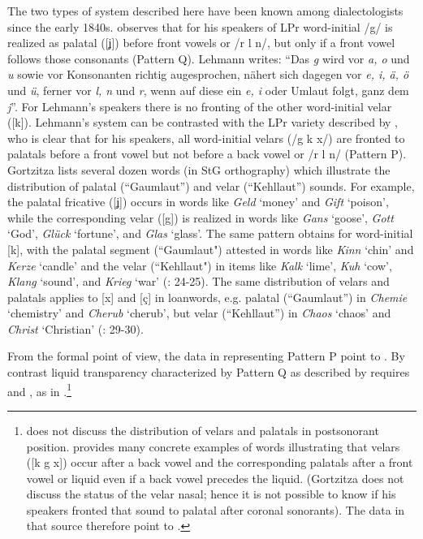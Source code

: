 The two types of system described here have been known among dialectologists since the early 1840s. \citet[30--32]{Lehmann1842} observes that for his speakers of LPr word-initial /g/ is realized as palatal ([ʝ]) before front vowels or /r l n/, but only if a front vowel follows those consonants (Pattern Q). Lehmann writes: “Das \textit{g} wird vor \textit{a, o} und \textit{u} sowie vor Konsonanten richtig augesprochen, nähert sich dagegen vor \textit{e, i, ä, ö} und \textit{ü}, ferner vor \textit{l, n} und \textit{r}, wenn auf diese ein \textit{e, i} oder Umlaut folgt, ganz dem \textit{j}”.  For Lehmann’s speakers there is no fronting of the other word-initial velar ([k]). Lehmann's system can be contrasted with the LPr variety described by \citet[29--30]{Gortzitza1841}, who is clear that for his speakers, all word-initial velars (/g k x/) are fronted to palatals before a front vowel but not before a back vowel or /r l n/ (Pattern P). Gortzitza lists several dozen words (in StG orthography) which illustrate the distribution of palatal (“Gaumlaut”) and velar (“Kehllaut”) sounds. For example, the palatal fricative ([ʝ]) occurs in words like \textit{Geld} ‘money’ and \textit{Gift} ‘poison’, while the corresponding velar ([g]) is realized in words like \textit{Gans} ‘goose’, \textit{Gott} ‘God’, \textit{Glück} ‘fortune’, and \textit{Glas} ‘glass’. The same pattern obtains for word-initial [k], with the palatal segment (“Gaumlaut") attested in words like \textit{Kinn} ‘chin’ and \textit{Kerze} ‘candle’ and the velar (“Kehllaut") in items like \textit{Kalk} ‘lime’, \textit{Kuh} ‘cow’, \textit{Klang} ‘sound’, and \textit{Krieg} ‘war’ (\citealt{Gortzitza1841}: 24-25). The same distribution of velars and palatals applies to [x] and [ç] in loanwords, e.g. palatal (“Gaumlaut”) in \textit{Chemie} ‘chemistry’ and \textit{Cherub} ‘cherub’, but velar (“Kehllaut”) in \textit{Chaos} ‘chaos’ and \textit{Christ} ‘Christian’ (\citealt{Gortzitza1841}: 29-30). 

From the formal point of view, the data in \citet{Gortzitza1841} representing Pattern P point to . By contrast liquid transparency characterized by Pattern Q as described by \citet{Lehmann1842} requires  and , as in .\footnote{\citet{Lehmann1842} does not discuss the distribution  of velars and palatals in postsonorant position. \citet{Gortzitza1841} provides many concrete examples of words illustrating that velars ([k g x]) occur after a back vowel and the corresponding palatals after a front vowel or liquid even if a back vowel precedes the liquid. (Gortzitza does not discuss the status of the velar nasal; hence it is not possible to know if his speakers fronted that sound to palatal after coronal sonorants). The data in that source therefore point to .}

